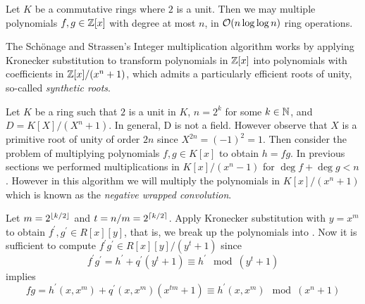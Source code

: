 \begin{theorem}
    Let $K$ be a commutative rings where $2$ is a unit. Then we may multiple polynomials $f, g \in {\mathbb Z}[x]$ with degree at most $n$, in $\mathcal O(n \log \log n)$ ring operations.
\end{theorem}

The Sch\"{o}nage and Strassen's Integer multiplication algorithm works by applying Kronecker substitution to transform polynomials in ${\mathbb Z}[x]$ into polynomials with coefficients in ${\mathbb Z}[x]/(x^n + 1)$, which admits a particularly efficient roots of unity, so-called \emph{synthetic roots}.


Let $K$ be a ring such that $2$ is a unit in $K$, $n = 2^k$ for some $k \in {\mathbb N}$, and $D = K[X] / (X^n + 1)$. In general, D is not a field. However observe that $X$ is a primitive root of unity of order $2n$ since $X^{2n} = (-1)^2 = 1$. 
Then consider the problem of multiplying polynomials $f, g \in K[x]$ to obtain $h = fg$. In previous sections we performed multiplications in $K[x]/(x^n - 1)$ for $\deg f + \deg g < n$. However in this algorithm we will multiply the polynomials in $K[x]/(x^n + 1)$ which is known as the \textit{negative wrapped convolution}. 

Let $m = 2^{\left \lfloor k / 2 \right \rfloor}$ and $t = n/m = 2^{\left \lceil k/2 \right \rceil}$. Apply Kronecker substitution with $y = x^m$ to obtain $f^\prime, g^\prime \in R[x][y]$, that is, we break up the polynomials into . Now it is sufficient to compute $f^\prime g^\prime \in R[x][y] /(y^t + 1)$ since
\[
  f^\prime g^\prime = h^\prime + q^\prime (y^t + 1) \equiv h^\prime \mod (y^t + 1)
\]
implies
\[
    fg = h^\prime (x, x^m) + q^\prime(x, x^m)(x^{tm} + 1) \equiv h^\prime(x, x^m) \mod (x^n + 1)
\]


